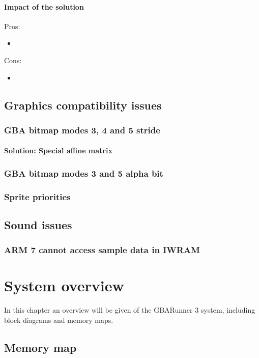 \documentclass[a4paper,10pt]{report}
\begin{document}
	\subsubsection{Impact of the solution}
	Pros:
	\begin{itemize}
		\item 
	\end{itemize}
	Cons:
	\begin{itemize}
		\item 
	\end{itemize}

\section{Graphics compatibility issues}
	\subsection{GBA bitmap modes 3, 4 and 5 stride}
	\subsubsection{Solution: Special affine matrix}
	
	\subsection{GBA bitmap modes 3 and 5 alpha bit}
	\subsection{Sprite priorities}

\section{Sound issues}
	\subsection{ARM 7 cannot access sample data in IWRAM}
	

\chapter{System overview}
	In this chapter an overview will be given of the GBARunner 3 system, including block diagrams and memory maps.
	\newpage
	\section{Memory map}
\end{document}
